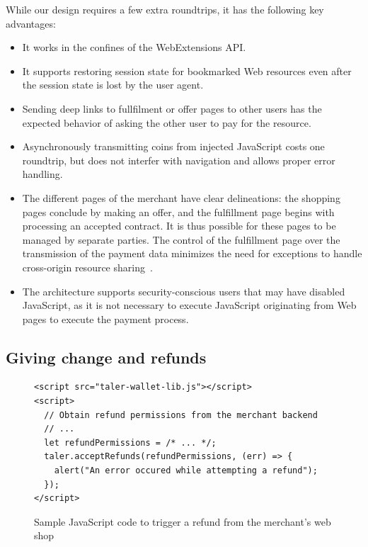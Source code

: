 \documentclass{llncs}
\begin{document}
\noindent
While our design requires a few extra roundtrips,
it has the following key advantages:
\begin{itemize}
  \item It works in the confines of the WebExtensions API.
  \item It supports restoring session state for bookmarked
    Web resources even after the session state is lost by the user agent.
  \item Sending deep links to fullfilment or offer pages to
    other users has the expected behavior
    of asking the other user to pay for the resource.
  \item Asynchronously transmitting coins from injected JavaScript costs
    one roundtrip, but does not interfer with navigation and allows
    proper error handling.
  \item The different pages of the merchant have clear
    delineations: the shopping pages conclude by making an offer, and
    the fulfillment page begins with processing an accepted contract.  It is thus
    possible for these pages to be managed by separate parties. The
    control of the fulfillment page over the transmission of the payment
    data minimizes the need for exceptions to handle cross-origin
    resource sharing~\cite{rfc6454,cors}.
  \item The architecture supports security-conscious users that may have
    disabled JavaScript, as it is not necessary to execute JavaScript
    originating from Web pages to execute the payment process.
\end{itemize}


\subsection{Giving change and refunds}

\begin{figure}[b!]
\begin{lstlisting}
<script src="taler-wallet-lib.js"></script>
<script>
  // Obtain refund permissions from the merchant backend
  // ...
  let refundPermissions = /* ... */;
  taler.acceptRefunds(refundPermissions, (err) => {
    alert("An error occured while attempting a refund");
  });
</script>
\end{lstlisting}
 \caption{Sample JavaScript code to trigger a refund from the merchant's web shop}
  \label{listing:refund}
\end{figure}
\end{document}
